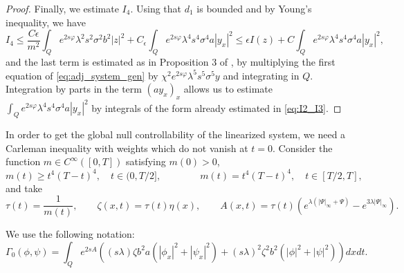 \documentclass[11pt,oneside,a4papper]{osajnl}
\begin{document}
\begin{proof}
Finally, we estimate $I_4$. Using that $d_1$ is bounded and by Young's inequality, we have
$$
I_4 \leq \frac{C \epsilon}{m^2}
\int_Q e^{2s\varphi} \lambda^2  s^2 \sigma^2 b^2 |z|^2 + C_\epsilon \int_Q e^{2s\varphi} \lambda^4  s^4 \sigma^4 a |y_x|^2 \leq \epsilon I(z) + C \int_Q e^{2s\varphi} \lambda^4  s^4 \sigma^4 a |y_x|^2,
$$
and the last term is estimated as in Proposition 3 of \cite{DemarqueLimacoViana_deg_sys2020}, by multiplying the first equation of \eqref{eq:adj_system_gen} by $\chi^2 e^{2s\varphi}\lambda^5 s^5 \sigma^5 y$ and integrating in $Q$. Integration by parts in the term $(a y_x)_x$ allows us to estimate $\int_Q e^{2s\varphi} \lambda^4  s^4 \sigma^4 a |y_x|^2$ by integrals of the form already estimated in \eqref{eq:I2_I3}.  
\end{proof}



In order to get the global null controllability of the linearized system, we need a Carleman inequality with weights which do not vanish at $t=0$. Consider the function $m \in C^\infty([0,T])$ satisfying $m(0)>0$,
\begin{equation}
\label{eq:def_m}
m(t) \geq t^4(T-t)^4, \quad t \in (0,T/2], \qquad\qquad m(t) = t^4(T-t)^4, \quad t \in [T/2,T],    
\end{equation}
and take
$$
\tau(t) = \frac{1}{m(t)}, \qquad \zeta(x,t) = \tau(t) \eta(x), \qquad A(x,t)  = \tau(t) (e^{\lambda(|\Psi|_\infty + \Psi)}-e^{3\lambda|\Psi|_\infty}).
$$

We use the following notation:
$$
\Gamma_0(\phi,\psi) = \int_Q e^{2s A}((s\lambda) \zeta b^2 a (|\phi_x|^2 + |\psi_x|^2) + (s\lambda)^2 {\zeta}^2 b^2 (|\phi|^2 + |\psi|^2))dxdt.
$$
\end{document}

